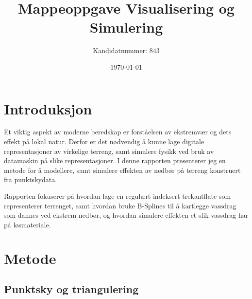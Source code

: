 \documentclass[norsk, doc, 11pt, a4paper]{apa7}  %
\title{Mappeoppgave Visualisering og Simulering}   %
\author{Kandidatnummer: 843}               %
\affiliation{Høgskolen i Innlandet}
\date{\today}                             %
\begin{document}
\maketitle                                %
\tableofcontents

\section{Introduksjon}
Et viktig aspekt av moderne beredskap er forståelsen av ekstremvær og dets effekt på lokal natur. Derfor er det nødvendig å kunne lage digitale representasjoner av virkelige terreng, samt simulere fysikk ved bruk av datamaskin på slike representasjoner. I denne rapporten presenterer jeg en metode for å modellere, samt simulere effekten av nedbør på terreng konstruert fra punktskydata.

Rapporten fokuserer på hvordan lage en regulært indeksert trekantflate som representerer terrenget, samt hvordan bruke B-Splines til å kartlegge vassdrag som dannes ved ekstrem nedbør, og hvordan simulere effekten et slik vassdrag har på løsmateriale.

\section{Metode}
\subsection{Punktsky og triangulering}
\end{document}
